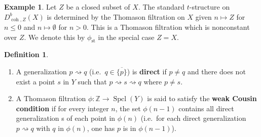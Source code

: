 \documentclass[11pt]{amsart}
\theoremstyle{plain}
\theoremstyle{definition}
\newtheorem{definition}[theorem]{Definition}
\newtheorem{example}[theorem]{Example}
\numberwithin{equation}{section}
\numberwithin{theorem}{section}
\begin{document}
\begin{example}\label{ex:standard_t_structure_filtration}
    Let $Z$ be a closed subset of $X$. The standard $t$-structure on $D^b_{\operatorname{coh},Z}(X)$ is determined by the Thomason filtration on $X$ given $n\mapsto Z$ for $n\leq 0$ and $n\mapsto \emptyset$ for $n>0$. This is a Thomason filtration which is nonconstant over $Z$. We denote this by $\phi_{\operatorname{st}}$ in the special case $Z=X$.
\end{example}

\begin{definition}\label{def:weak_cousin}
    \hfill
    \begin{enumerate}
        \item A generalization  $p\rightsquigarrow q$ (i.e.\ $q\in \overline{\{ p\}}$) is \textbf{direct} if $p\not=q$ and there does not exist a point $s$ in $Y$ such that $p\rightsquigarrow s \rightsquigarrow q$ where $p\not=s$.
        \item A Thomason filtration $\phi \colon \mathbb{Z} \to \operatorname{Spcl}(Y)$ is said to satisfy the \textbf{weak Cousin condition} if for every integer $n$, the set $\phi (n-1)$ contains all direct generalization s of each point in $\phi (n)$ (i.e.\ for each direct generalization  $p \rightsquigarrow q$ with $q$ in $\phi (n)$, one has $p$ is in $\phi (n-1)$).
    \end{enumerate}
\end{definition}
\end{document}
